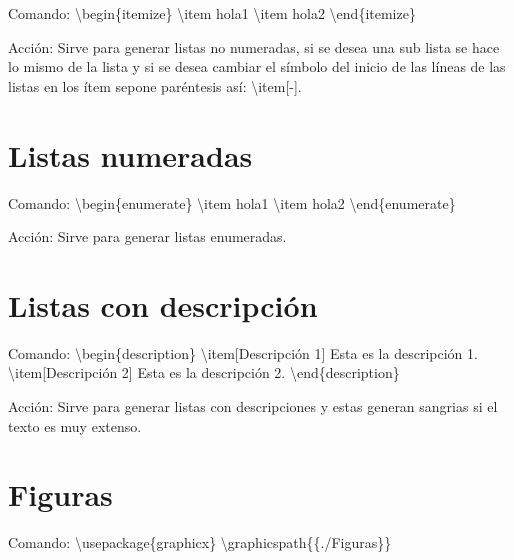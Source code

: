 \documentclass[a4paper, 12pt]{article}
\begin{document}
\begin{flushleft}
		Comando: \textbackslash begin\{itemize\}\newline
		\textbackslash item hola1\newline
		\textbackslash item hola2\newline
		\textbackslash end\{itemize\}\newline
		
		Acción: Sirve para generar listas no numeradas, si se desea una sub lista se hace lo mismo de la lista y si se desea cambiar el símbolo del inicio de las líneas de las listas en los ítem sepone paréntesis así: \textbackslash item[-].\newline
		
		\section{Listas numeradas}
		
		Comando: \textbackslash begin\{enumerate\}\newline
		\textbackslash item hola1\newline
		\textbackslash item hola2\newline
		\textbackslash end\{enumerate\}\newline
		
		Acción: Sirve para generar listas enumeradas.\newline
		
		\section{Listas con descripción}
		
		Comando: \textbackslash begin\{description\}\newline
		\textbackslash item[Descripción 1] Esta es la descripción 1.\newline
		\textbackslash item[Descripción 2] Esta es la descripción 2.\newline
		\textbackslash end\{description\}\newline
		
		Acción: Sirve para generar listas con descripciones y estas generan sangrias si el texto es muy extenso.\newline
		
		\section{Figuras}
		
		Comando: \textbackslash usepackage\{graphicx\}\newline
		\textbackslash graphicspath\{\{./Figuras\}\}\newline
		

\end{flushleft}
\end{document}
